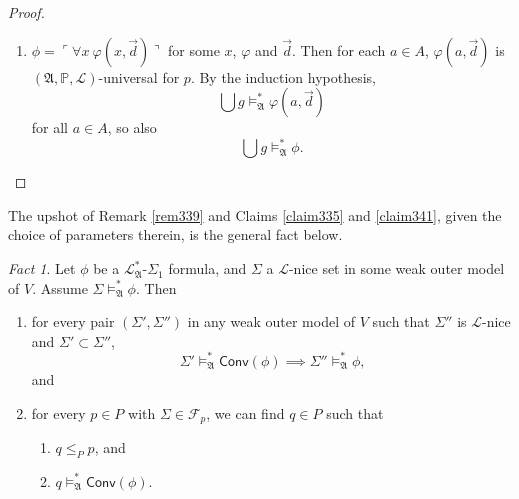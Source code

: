 \documentclass[12pt, twoside]{memoir}
\numberwithin{equation}{section}
\theoremstyle{definition}
\theoremstyle{remark}
\newtheorem{fact}[thm]{Fact}
\theoremstyle{definition}
\theoremstyle{definition}
\theoremstyle{definition}
\theoremstyle{remark}
\begin{document}
\begin{proof}
\begin{enumerate}[label=Case \arabic*:, leftmargin=50pt]
    We have also shown that $\bigcup g$ is $\mathcal{L}$-nice. As a result, the pair $(q^*, \bigcup g)$ satisfies the hypothesis of Claim \ref{claim341}. Applying Claim \ref{claim341} to $(q^*, \bigcup g)$ then gives us
    \begin{equation*}
        q^* \models^{*}_{\mathfrak{A}} \phi^{\dagger} \implies \bigcup g \models^{*}_{\mathfrak{A}} \phi \text{.}
    \end{equation*}
    Now $q^* \in D_2$ just means $$q^* \models^{*}_{\mathfrak{A}} \phi^{\dagger},$$ so necessarily, 
    \begin{equation*}
        \bigcup g \models^{*}_{\mathfrak{A}} \phi \text{.}
    \end{equation*}
    
    \item $\phi = \ulcorner \forall x \ \varphi(x, \Vec{d}) \urcorner$ for some $x$, $\varphi$ and $\Vec{d}$. Then for each $a \in A$, $\varphi(a, \Vec{d})$ is $(\mathfrak{A}, \mathbb{P}, \mathcal{L})$-universal for $p$. By the induction hypothesis, $$\bigcup g \models^{*}_{\mathfrak{A}} \varphi(a, \Vec{d})$$ for all $a \in A$, so also $$\bigcup g \models^{*}_{\mathfrak{A}} \phi.$$ \qedhere
\end{enumerate}
\end{proof}

The upshot of Remark \ref{rem339} and Claims \ref{claim335} and \ref{claim341}, given the choice of parameters therein, is the general fact below. 

\begin{fact}\label{fact336}
Let $\phi$ be a $\mathcal{L}^{*}_{\mathfrak{A}}$-$\Sigma_1$ formula, and $\Sigma$ a $\mathcal{L}$-nice set in some weak outer model of $V$.
Assume $\Sigma \models^{*}_{\mathfrak{A}} \phi$. Then
\begin{enumerate}[label=(\arabic*)]
    \item\label{3363} for every pair $(\Sigma', \Sigma'')$ in any weak outer model of $V$ such that $\Sigma''$ is $\mathcal{L}$-nice and $\Sigma' \subset \Sigma''$,
    \begin{equation*}
        \Sigma' \models^{*}_{\mathfrak{A}} \mathsf{Conv}(\phi) \implies \Sigma'' \models^{*}_{\mathfrak{A}} \phi \text{,}
    \end{equation*}
    and
    \item\label{3361} for every $p \in P$ with $\Sigma \in \mathcal{F}_p$, we can find $q \in P$ such that
    \begin{enumerate}[label=(\alph*)]
        \item $q \leq_P p$, and
        \item\label{3362} $q \models^{*}_{\mathfrak{A}} \mathsf{Conv}(\phi)$. 
    \end{enumerate}
\end{enumerate}
\end{fact}
\end{document}
